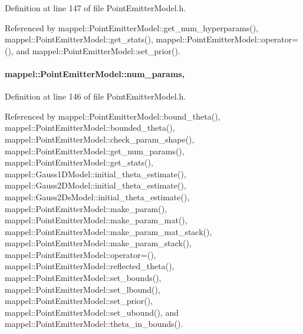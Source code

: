 Definition at line 147 of file Point\+Emitter\+Model.\+h.



Referenced by mappel\+::\+Point\+Emitter\+Model\+::get\+\_\+num\+\_\+hyperparams(), mappel\+::\+Point\+Emitter\+Model\+::get\+\_\+stats(), mappel\+::\+Point\+Emitter\+Model\+::operator=(), and mappel\+::\+Point\+Emitter\+Model\+::set\+\_\+prior().

\paragraph[{\texorpdfstring{num\+\_\+params}{num_params}}]{ mappel\+::\+Point\+Emitter\+Model\+::num\+\_\+params\hspace{0.3cm}{\ttfamily [protected]}, {\ttfamily [inherited]}}\hypertarget{classmappel_1_1PointEmitterModel_a9af0484391bd6021ddc04ac666ab49ad}{}\label{classmappel_1_1PointEmitterModel_a9af0484391bd6021ddc04ac666ab49ad}


Definition at line 146 of file Point\+Emitter\+Model.\+h.



Referenced by mappel\+::\+Point\+Emitter\+Model\+::bound\+\_\+theta(), mappel\+::\+Point\+Emitter\+Model\+::bounded\+\_\+theta(), mappel\+::\+Point\+Emitter\+Model\+::check\+\_\+param\+\_\+shape(), mappel\+::\+Point\+Emitter\+Model\+::get\+\_\+num\+\_\+params(), mappel\+::\+Point\+Emitter\+Model\+::get\+\_\+stats(), mappel\+::\+Gauss1\+D\+Model\+::initial\+\_\+theta\+\_\+estimate(), mappel\+::\+Gauss2\+D\+Model\+::initial\+\_\+theta\+\_\+estimate(), mappel\+::\+Gauss2\+Ds\+Model\+::initial\+\_\+theta\+\_\+estimate(), mappel\+::\+Point\+Emitter\+Model\+::make\+\_\+param(), mappel\+::\+Point\+Emitter\+Model\+::make\+\_\+param\+\_\+mat(), mappel\+::\+Point\+Emitter\+Model\+::make\+\_\+param\+\_\+mat\+\_\+stack(), mappel\+::\+Point\+Emitter\+Model\+::make\+\_\+param\+\_\+stack(), mappel\+::\+Point\+Emitter\+Model\+::operator=(), mappel\+::\+Point\+Emitter\+Model\+::reflected\+\_\+theta(), mappel\+::\+Point\+Emitter\+Model\+::set\+\_\+bounds(), mappel\+::\+Point\+Emitter\+Model\+::set\+\_\+lbound(), mappel\+::\+Point\+Emitter\+Model\+::set\+\_\+prior(), mappel\+::\+Point\+Emitter\+Model\+::set\+\_\+ubound(), and mappel\+::\+Point\+Emitter\+Model\+::theta\+\_\+in\+\_\+bounds().

